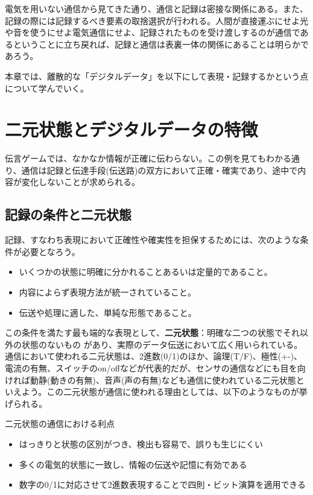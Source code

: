 電気を用いない通信から見てきた通り、通信と記録は密接な関係にある。また、記録の際には記録するべき要素の取捨選択が行われる。人間が直接運ぶにせよ光や音を使うにせよ電気通信にせよ、記録されたものを受け渡しするのが通信であるということに立ち戻れば、記録と通信は表裏一体の関係にあることは明らかであろう。

本章では、離散的な「デジタルデータ」を以下にして表現・記録するかという点について学んでいく。


\section{二元状態とデジタルデータの特徴}

伝言ゲームでは、なかなか情報が正確に伝わらない。この例を見てもわかる通り、通信は記録と伝達手段(伝送路)の双方において正確・確実であり、途中で内容が変化しないことが求められる。

\subsection{記録の条件と二元状態}
記録、すなわち表現において正確性や確実性を担保するためには、次のような条件が必要となろう。
\begin{itemize}
\item いくつかの状態に明確に分かれることあるいは定量的であること。
\item 内容によらず表現方法が統一されていること。
\item 伝送や処理に適した、単純な形態であること。
\end{itemize}

この条件を満たす最も端的な表現として、\textbf{二元状態}：明確な二つの状態でそれ以外の状態のないもの があり、実際のデータ伝送において広く用いられている。通信において使われる二元状態は、2進数(0/1)のほか、論理(T/F)、極性(+-)、電流の有無、スイッチのon/offなどが代表的だが、センサの通信などにも目を向ければ動静(動きの有無)、音声(声の有無)なども通信に使われている二元状態といえよう。この二元状態が通信に使われる理由としては、以下のようなものが挙げられる。
\begin{itembox}[l]{二元状態の通信における利点}
\begin{itemize}
\item はっきりと状態の区別がつき、検出も容易で、誤りも生じにくい
\item 多くの電気的状態に一致し、情報の伝送や記憶に有効である
\item 数字の0/1に対応させて2進数表現することで四則・ビット演算を適用できる
\end{itemize}
\end{itembox}

